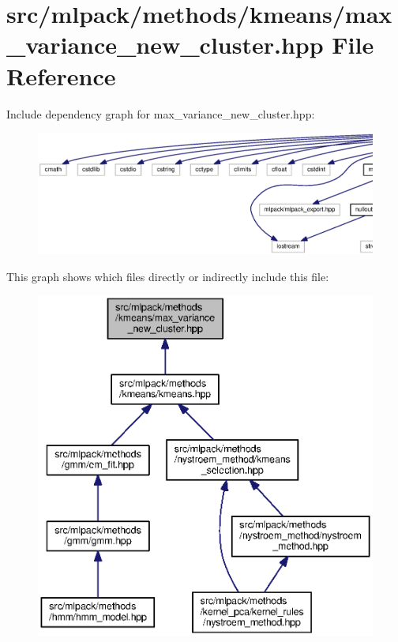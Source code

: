 \section{src/mlpack/methods/kmeans/max\+\_\+variance\+\_\+new\+\_\+cluster.hpp File Reference}
\label{max__variance__new__cluster_8hpp}
Include dependency graph for max\+\_\+variance\+\_\+new\+\_\+cluster.\+hpp\+:
\nopagebreak
\begin{figure}[H]
\begin{center}
\leavevmode
\includegraphics[width=350pt]{max__variance__new__cluster_8hpp__incl}
\end{center}
\end{figure}
This graph shows which files directly or indirectly include this file\+:
\nopagebreak
\begin{figure}[H]
\begin{center}
\leavevmode
\includegraphics[width=350pt]{max__variance__new__cluster_8hpp__dep__incl}
\end{center}
\end{figure}
